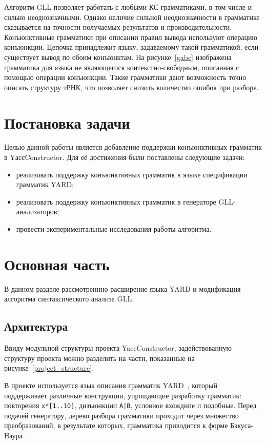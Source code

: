 \documentclass[14pt]{matmex-diploma-custom}
\begin{document}
Алгоритм GLL позволяет работать с любыми КС-грамматиками, в том числе и сильно неоднозначными. Однако наличие сильной неоднозначности в грамматике сказывается на точности получаемых результатов и производительности. 
	Конъюнктивные грамматики при описании правил вывода используют операцию конъюнкции. Цепочка принадлежит языку, задаваемому такой грамматикой, если существует вывод по обоим конъюнктам. На рисунке~\ref{gabc} изображена грамматика для языка не являющегося контекстно-свободным, описанная с помощью операции конъюнкции. Такие грамматики дают возможность точно описать структуру тРНК, что позволяет снизить количество ошибок при разборе.

\section{Постановка задачи}

Целью данной работы является добавление поддержки конъюнктивных грамматик в YассConstructor. Для её достижения были поставлены следующие задачи:

\begin{itemize}
    \item реализовать поддержку конъюнктивных грамматик в языке спецификации грамматик YARD;
    \item реализовать поддержку конъюнктивных грамматик в генераторе GLL-анализаторов;
    \item провести экспериментальные исследования работы алгоритма.
\end{itemize}


\section{Основная часть}

В данном разделе рассмотреннно расширение языка YARD и модификация алгоритма синтаксического анализа GLL.


\subsection{Архитектура}

Ввиду модульной структуры проекта YaccConstructor, задействованную структуру проекта можно разделить на части, показанные на рисунке~\ref{project_structure}.

В проекте используется язык описания грамматик YARD~\cite{YARD}, который поддерживает различные конструкции, упрощающие разработку грамматик: повторения \verb|x*[1..10]|, дизъюнкции \texttt{A|B}, условное вхождние и подобные. Перед подачей генератору, дерево разбора грамматики проходит через множество преобразований, в результате которых, грамматика приводится к форме Бэкуса-Наура~\cite{BNF}.
\end{document}
